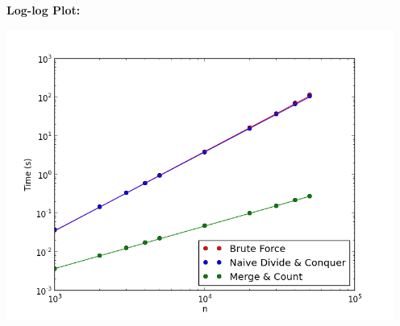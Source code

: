 \documentclass[letterpaper,10pt,titlepage,fleqn]{article}
\begin{document}
\textbf{Log-log Plot:}
\vskip 0.04in
\begin{center}

\includegraphics[width=5in]{loglog.png}

\end{center}
\end{document}
